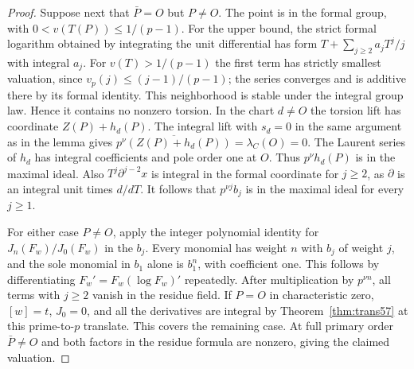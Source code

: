 \documentclass[a4paper,11pt]{article}
\theoremstyle{definition}
\theoremstyle{remark}
\numberwithin{equation}{section}
\begin{document}
\begin{proof}
Suppose next that \(\bar P=O\) but \(P\ne O\). The point is in
the formal group, with \(0<v(T(P))\le1/(p-1)\).
For the upper bound, the strict formal logarithm obtained by
integrating the unit differential has form
\(T+\sum_{j\ge2}a_jT^j/j\) with integral \(a_j\).
For \(v(T)>1/(p-1)\) the first term has strictly smallest
valuation, since \(v_p(j)\le(j-1)/(p-1)\); the series converges
and is additive there by its formal identity. This neighborhood
is stable under the integral group law. Hence it contains no
nonzero torsion. In the chart \(d\ne O\) the torsion lift has
coordinate \(Z(P)+h_d(P)\). The integral lift with \(s_d=0\)
in the same argument as in the lemma gives
\(\overline{p^\nu(Z(P)+h_d(P))}=\lambda_C(O)=0\).
The Laurent series of \(h_d\) has integral coefficients and
pole order one at \(O\). Thus \(p^\nu h_d(P)\) is in the
maximal ideal. Also \(T^j\partial^{j-2}x\) is integral in the
formal coordinate for \(j\ge2\), as \(\partial\) is an integral
unit times \(d/dT\). It follows that \(p^{\nu j}b_j\) is in the
maximal ideal for every \(j\ge1\).

For either case \(P\ne O\), apply the integer polynomial identity
for \(J_n(F_w)/J_0(F_w)\) in the \(b_j\). Every monomial has
weight \(n\) with \(b_j\) of weight \(j\), and the sole monomial
in \(b_1\) alone is \(b_1^n\), with coefficient one. This follows
by differentiating \(F_w'=F_w(\log F_w)'\) repeatedly. After
multiplication by \(p^{\nu n}\), all terms with \(j\ge2\)
vanish in the residue field. If \(P=O\) in characteristic zero,
\([w]=t\), \(J_0=0\), and all the derivatives are integral by
Theorem~\ref{thm:trans57} at this prime-to-\(p\) translate.
This covers the remaining case. At full primary order \(\bar P\ne O\)
and both factors in the residue formula are nonzero, giving the
claimed valuation.
\end{proof}
\end{document}

